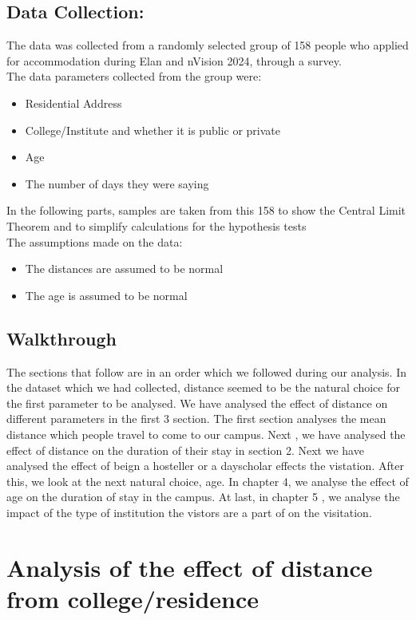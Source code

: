 \documentclass[oneside]{book}
\begin{document}
\section{Data Collection:}
The data was collected from a randomly selected group of 158 people who applied for accommodation during Elan and nVision 2024, through a survey.\\


The data parameters collected from the group were:
\begin{itemize}
    \item Residential Address
    \item College/Institute and whether it is public or private
    \item Age
    \item The number of days they were saying
\end{itemize}

In the following parts, samples are taken from this 158 to show the Central Limit Theorem and to simplify calculations for the hypothesis tests\\


The assumptions made on the data:
\begin{itemize}
    \item The distances are assumed to be normal
    \item The age is assumed to be normal
\end{itemize}




\section{Walkthrough}
The sections that follow are in an order which we followed during our analysis. In the dataset which we had collected, distance seemed to be the natural choice for the first parameter to be analysed. We have analysed the effect of distance on different parameters in the first 3 section. The first section analyses the mean distance which people travel to come to our campus. Next , we have analysed the effect of distance on the duration of their stay in section 2. Next we have analysed the effect of beign a hosteller or a dayscholar effects the vistation. After this, we look at the next natural choice, age. In chapter 4, we analyse the effect of age on the duration of stay in the campus. At last, in chapter 5 , we analyse the impact of the type of institution the vistors are a part of on the visitation.

\chapter{Analysis of the effect of distance from college/residence}
\end{document}
